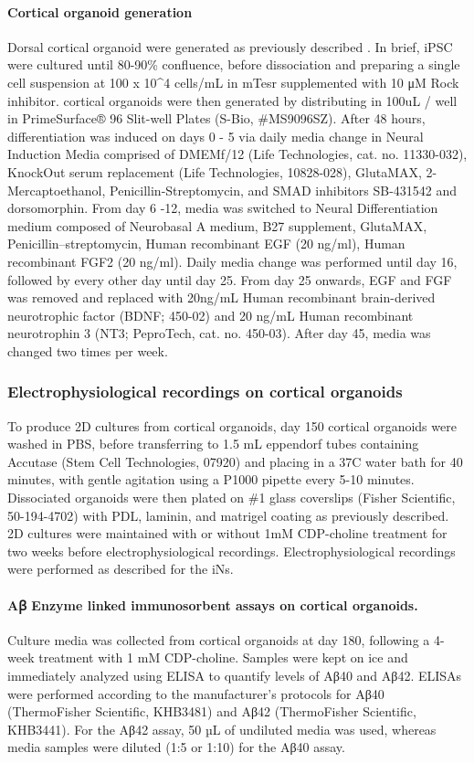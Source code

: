 \paragraph{Cortical organoid generation}
Dorsal cortical organoid were generated as previously described \cite{Sloan2018-ja}. In brief, iPSC were cultured until 80-90\% confluence, before dissociation and preparing a single cell suspension at 100 x 10^4 cells/mL in mTesr supplemented with 10 μM Rock inhibitor. cortical organoids were then generated by distributing in 100uL / well in PrimeSurface® 96 Slit-well Plates (S-Bio, \#MS9096SZ). After 48 hours, differentiation was induced on days 0 - 5 via daily media change in Neural Induction Media comprised of DMEMf/12 (Life Technologies, cat. no. 11330-032), KnockOut serum replacement (Life Technologies, 10828-028), GlutaMAX, 2-Mercaptoethanol, Penicillin-Streptomycin, and SMAD inhibitors SB-431542 and dorsomorphin. From day 6 -12, media was switched to Neural Differentiation medium composed of Neurobasal A medium, B27 supplement, GlutaMAX, Penicillin–streptomycin, Human recombinant EGF (20 ng/ml), Human recombinant FGF2 (20 ng/ml). Daily media change was performed until day 16, followed by every other day until day 25. From day 25 onwards, EGF and FGF was removed and replaced with 20ng/mL Human recombinant brain-derived neurotrophic factor (BDNF; 450-02) and 20 ng/mL Human recombinant neurotrophin 3 (NT3; PeproTech, cat. no. 450-03). After day 45, media was changed two times per week. 

\subsubsection{Electrophysiological recordings on cortical organoids}
To produce 2D cultures from cortical organoids, day 150 cortical organoids were washed in PBS, before transferring to 1.5 mL eppendorf tubes containing Accutase (Stem Cell Technologies, 07920) and placing in a 37C water bath for 40 minutes, with gentle agitation using a P1000 pipette every 5-10 minutes. Dissociated organoids were then plated on \#1 glass coverslips (Fisher Scientific, 50-194-4702) with PDL, laminin, and matrigel coating as previously described. 2D cultures were maintained with or without 1mM CDP-choline treatment for two weeks before electrophysiological recordings. Electrophysiological recordings were performed as described for the iNs.

\paragraph{Aꞵ Enzyme linked immunosorbent assays on cortical organoids.}
Culture media was collected from cortical organoids at day 180, following a 4-week treatment with 1 mM CDP-choline. Samples were kept on ice and immediately analyzed using ELISA to quantify levels of Aβ40 and Aβ42. ELISAs were performed according to the manufacturer’s protocols for Aβ40 (ThermoFisher Scientific, KHB3481) and Aβ42 (ThermoFisher Scientific, KHB3441). For the Aβ42 assay, 50 µL of undiluted media was used, whereas media samples were diluted (1:5 or 1:10) for the Aβ40 assay.


